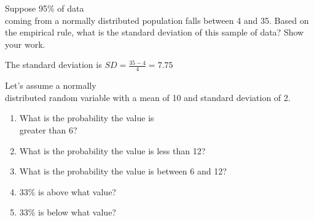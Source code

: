 \documentclass[11pt]{book}\usepackage[]{graphicx}\usepackage[]{color}
\begin{document}
\begin{exercises}
\begin{exercise}
	\end{exercise}
	\begin{solution}  %

%

 	\end{solution}

  \begin{exercise} %

Suppose 95\% of data \\ coming from a normally distributed population falls between 4 and 35.  Based on the empirical rule, what is the standard deviation of this sample of data?  Show your work.

  \end{exercise}
  \begin{solution}   %



    The standard deviation is $SD = \frac{35 - 4}{4} = 7.75$
  \end{solution}

	\begin{exercise}  %
	


Let's assume a normally \\ distributed random variable with a mean of 10 and standard deviation of 2.

\begin{enumerate}
\item What is the probability the value is \\ greater than 6?
\item What is the probability the value is less than 12?
\item What is the probability the value is between 6 and 12?
\item 33\% is above what value?
\item 33\% is below what value?
\end{enumerate}


\end{exercise}
\end{exercises}
\end{document}
